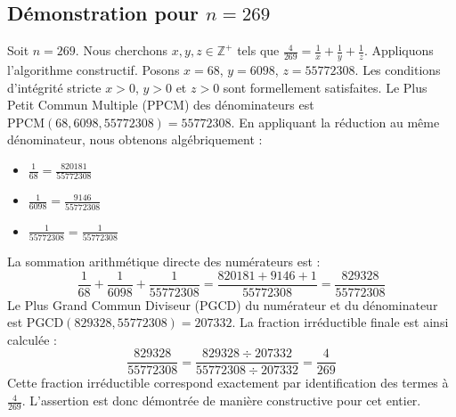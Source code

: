 \documentclass[11pt,a4paper]{article}
\begin{document}
\subsection{Démonstration pour $n = 269$}
Soit $n = 269$. Nous cherchons $x, y, z \in \mathbb{Z}^{+}$ tels que $\frac{4}{269} = \frac{1}{x} + \frac{1}{y} + \frac{1}{z}$.
Appliquons l'algorithme constructif. Posons $x = 68$, $y = 6098$, $z = 55772308$.
Les conditions d'intégrité stricte $x > 0$, $y > 0$ et $z > 0$ sont formellement satisfaites.
Le Plus Petit Commun Multiple (PPCM) des dénominateurs est $\text{PPCM}(68, 6098, 55772308) = 55772308$.
En appliquant la réduction au même dénominateur, nous obtenons algébriquement :
\begin{itemize}
    \item $\frac{1}{68} = \frac{820181}{55772308}$
    \item $\frac{1}{6098} = \frac{9146}{55772308}$
    \item $\frac{1}{55772308} = \frac{1}{55772308}$
\end{itemize}
La sommation arithmétique directe des numérateurs est :
$$ \frac{1}{68} + \frac{1}{6098} + \frac{1}{55772308} = \frac{820181 + 9146 + 1}{55772308} = \frac{829328}{55772308} $$
Le Plus Grand Commun Diviseur (PGCD) du numérateur et du dénominateur est $\text{PGCD}(829328, 55772308) = 207332$.
La fraction irréductible finale est ainsi calculée :
$$ \frac{829328}{55772308} = \frac{829328 \div 207332}{55772308 \div 207332} = \frac{4}{269} $$
Cette fraction irréductible correspond exactement par identification des termes à $\frac{4}{269}$. L'assertion est donc démontrée de manière constructive pour cet entier.
\end{document}
